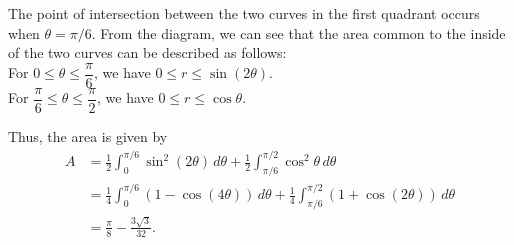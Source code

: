 \documentclass[12pt]{article}
\begin{document}
\begin{enumerate}
\begin{enumerate}
The point of intersection between the two curves in the first quadrant occurs when $\theta = \pi/6$. From the diagram, we can see that the area common to the inside of the two curves can be described as follows:\\
For $0\leq \theta\leq \dfrac{\pi}{6}$, we have $0\leq r\leq \sin(2\theta)$.\\
For $\dfrac{\pi}{6}\leq \theta \leq \dfrac{\pi}{2}$, we have $0\leq r\leq \cos\theta$.

Thus, the area is given by
\begin{align*}
 A & = \frac{1}{2}\int_0^{\pi/6}\sin^2(2\theta)\,d\theta + \frac{1}{2}\int_{\pi/6}^{\pi/2}\cos^2\theta\,d\theta\\
& = \frac{1}{4}\int_0^{\pi/6}(1-\cos(4\theta))\,d\theta + \frac{1}{4}\int_{\pi/6}^{\pi/2}(1+\cos(2\theta))\,d\theta\\
& = \frac{\pi}{8}-\frac{3\sqrt{3}}{32}.
\end{align*}

\end{enumerate}
\end{enumerate}
\end{document}
